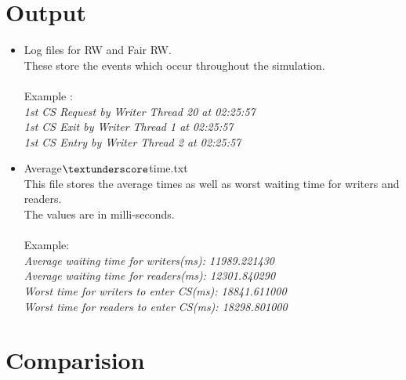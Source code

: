 \documentclass[12pt]{article}
\begin{document}
\section{Output}
\begin{itemize}
\item Log files for RW and Fair RW.\\
These store the events which occur throughout the simulation.\\
\\Example : \\
\textit{1st CS Request by Writer Thread 20 at 02:25:57\\}
\textit{1st CS Exit by Writer Thread 1 at 02:25:57\\}
\textit{1st CS Entry by Writer Thread 2 at 02:25:57\\}
\item Average$\textunderscore$time.txt\\
This file stores the average times as well as worst waiting time for writers and readers.\\
The values are in milli-seconds.\\
\\Example: \\
\textit{Average waiting time for writers(ms): 11989.221430}\\
\textit{Average waiting time for readers(ms): 12301.840290}\\
\textit{Worst time for writers to enter CS(ms): 18841.611000}\\
\textit{Worst time for readers to enter CS(ms): 18298.801000}\\
\end{itemize}

\newpage

\section{Comparision}
\end{document}
